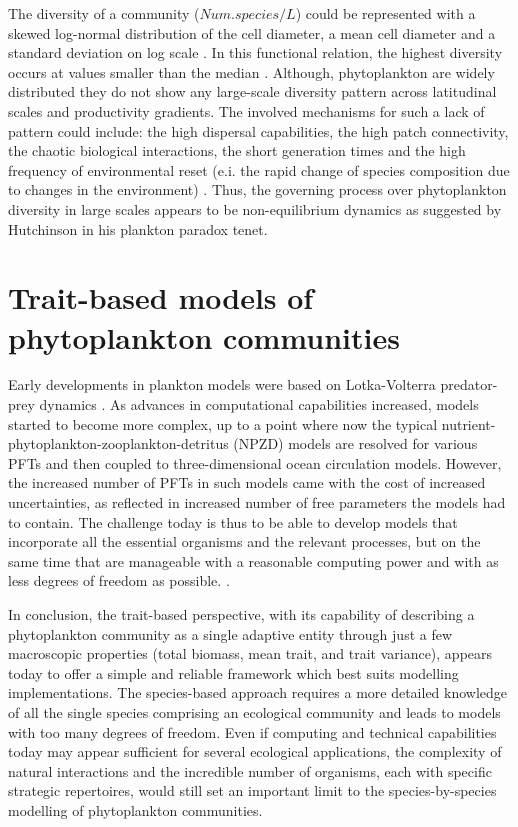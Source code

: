 The diversity of a community ($Num.species /L$) could be represented with a skewed log-normal distribution of the cell diameter, a mean cell diameter and a standard deviation on log scale \citep{Irwin2006}. In this functional relation, the highest diversity occurs at values smaller than the median \citep{Irwin2006, Cermeno2008a, Finkel2009a}. Although, phytoplankton are widely distributed they do not show any large-scale diversity pattern across latitudinal scales and productivity gradients. The involved mechanisms for such a lack of pattern could include: the high dispersal capabilities, the high patch connectivity, the chaotic biological interactions, the short generation times and the high frequency of environmental reset (e.i. the rapid change of species composition due to changes in the environment) \citep{Cermeno2008}. Thus, the governing process over phytoplankton diversity in large scales appears to be non-equilibrium dynamics as suggested by Hutchinson\citeyearpar {Hutchinson1961} in his plankton paradox tenet.

\section{Trait-based models of phytoplankton communities}
Early developments in plankton models were based on Lotka-Volterra predator-prey dynamics \citep{Fleming1939}. As advances in computational capabilities increased, models started to become more complex, up to a point where now the typical nutrient-phytoplankton-zooplankton-detritus (NPZD) models are resolved for various PFTs and then coupled to three-dimensional ocean circulation models. However, the increased number of PFTs in such models came with the cost of increased uncertainties, as reflected in increased number of  free parameters the models had to contain. The challenge today is thus to be able to develop models that incorporate all the essential organisms and the relevant processes, but on the same time that are manageable with a reasonable computing power and with as less degrees of freedom as possible. \citep{Anderson2010}.

In conclusion, the trait-based perspective, with its capability of describing a phytoplankton community as a single adaptive entity through just a few macroscopic properties (total biomass, mean trait, and trait variance), appears today to offer a simple and reliable framework which best suits modelling implementations. The species-based approach requires a more detailed knowledge of all the single species comprising an ecological community and leads to models with too many degrees of freedom. Even if computing and technical capabilities today may appear sufficient for several ecological applications, the complexity of natural interactions and the incredible number of organisms, each with specific strategic repertoires, would still set an important limit to the species-by-species modelling of phytoplankton communities.

